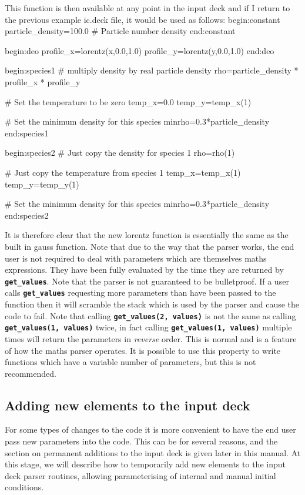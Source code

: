 \documentclass[12pt,a4paper]{article}
\newcommand{\inlinecode}[1]{{\color{warwickred} \bf\texttt{#1}}}
\newenvironment{boxverbatim}{\lboxverbatim{none}}{\endlboxverbatim}
\begin{document}
This function is then available at any point in the input deck and if I return
to the previous example ic.deck file, it would be used as follows:
\begin{boxverbatim}
begin:constant
   particle_density=100.0 # Particle number density
end:constant

begin:deo
   profile_x=lorentz(x,0.0,1.0)
   profile_y=lorentz(y,0.0,1.0)
end:deo

begin:species1
   # multiply density by real particle density
   rho=particle_density * profile_x * profile_y

   # Set the temperature to be zero
   temp_x=0.0
   temp_y=temp_x(1)

   # Set the minimum density for this species
   minrho=0.3*particle_density
end:species1

begin:species2
   # Just copy the density for species 1
   rho=rho(1)

   # Just copy the temperature from species 1
   temp_x=temp_x(1)
   temp_y=temp_y(1)

   # Set the minimum density for this species
   minrho=0.3*particle_density
end:species2
\end{boxverbatim}

It is therefore clear that the new lorentz function is essentially the same as
the built in gauss function. Note that due to the way that the parser works,
the end user is not required to deal with parameters which are themselves
maths expressions. They have been fully evaluated by the time they are
returned by \inlinecode{get\_values}. Note that the parser is not guaranteed to
be bulletproof. If a user calls \inlinecode{get\_values} requesting more
parameters than have been passed to the function then it will scramble the
stack which is used by the parser and cause the code to fail. Note that
calling \inlinecode{get\_values(2, values)} is not the same as calling
\inlinecode{get\_values(1, values)} twice, in fact calling
\inlinecode{get\_values(1, values)} multiple times will return the parameters in
{\it reverse} order. This is normal and is a feature of how the maths parser
operates. It is possible to use this property to write functions which have a
variable number of parameters, but this is not recommended.

\subsection{Adding new elements to the input deck}

For some types of changes to the code it is more convenient to have the end
user pass new parameters into the code. This can be for several reasons, and
the section on permanent additions to the input deck is given later in this
manual. At this stage, we will describe how to temporarily add new
elements to the input deck parser routines, allowing parameterising of
internal and manual initial conditions.
\end{document}
